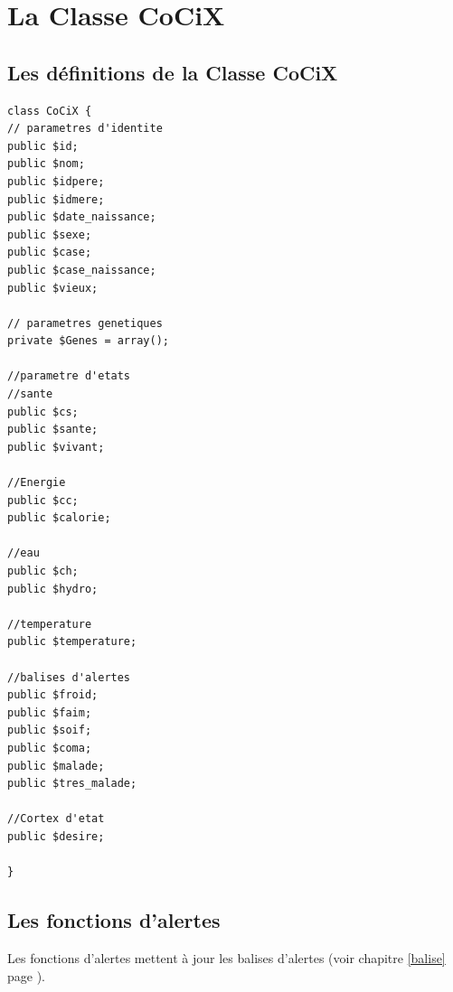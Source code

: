 \documentclass[french]{report}
\begin{document}
\section{La Classe CoCiX}\label{classe_CoCiX}
\subsection{Les définitions de la Classe CoCiX}


\begin{lstlisting}[frame=single,caption={Classe CoCiX}]
class CoCiX {
// parametres d'identite
public $id;
public $nom;
public $idpere;
public $idmere;
public $date_naissance;
public $sexe;
public $case;
public $case_naissance;
public $vieux;

// parametres genetiques
private $Genes = array();

//parametre d'etats
//sante
public $cs;
public $sante;
public $vivant;

//Energie
public $cc;
public $calorie;

//eau
public $ch;
public $hydro;

//temperature
public $temperature;

//balises d'alertes
public $froid;
public $faim;
public $soif;
public $coma;
public $malade;
public $tres_malade;

//Cortex d'etat
public $desire;

}
\end{lstlisting}

\subsection{Les fonctions d'alertes}
Les fonctions d'alertes mettent à jour les balises d'alertes (voir chapitre \ref{balise} page \pageref{balise}).\\
\end{document}
